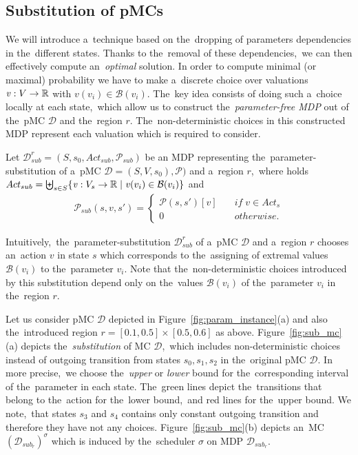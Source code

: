 \subsection{Substitution of pMCs}
We will introduce a~technique based on the~dropping of parameters dependencies in the~different states.
Thanks to the~removal of these dependencies,~we can then effectively compute an~\textit{optimal} solution.
In order to compute minimal (or maximal) probability we have to make a~discrete choice over valuations $\mathit{v}: V \rightarrow \mathbb{R}$ with $\mathit{v}(v_i) \in \mathcal{B}(v_i)$.
The~key idea consists of doing such a~choice locally at each state,~which allow us to construct the~\textit{parameter-free MDP} out of the~pMC $\mathcal{D}$ and the~region $r$.
The~non-deterministic choices in this constructed MDP represent each valuation which is required to consider.

\begin{definition} \label{def:sub_mc}
Let $\mathcal{D}_{sub}^{r} = (S, s_0, Act_{sub}, \mathcal{P}_{sub})$ be an MDP representing the~parameter-substitution of a~pMC $\mathcal{D} = (S, V, s_0), \mathcal{P})$ and a~region $r$,~where holds $Act_{sub} = \biguplus_{s \in S}\{ \mathit{v}: V_s \rightarrow \mathbb{R} \; \lvert \; \mathit{v}(v_i) \in \mathcal{B}(v_i) \}$ and
\begin{align*}
    \mathcal{P}_{sub}(s, \mathit{v}, s') = 
    \begin{cases}
        \mathcal{P}(s, s')[\mathit{v}] \quad & if \; v \in Act_s \\
        0 \quad & otherwise.
    \end{cases}
\end{align*}
\end{definition}
\noindent
Intuitively,~the~parameter-substitution $\mathcal{D}_{sub}^r$ of a~pMC $\mathcal{D}$ and a~region $r$ chooses an~action $\mathit{v}$ in state $s$ which corresponds to the~assigning of extremal values $\mathcal{B}(v_i)$ to the~parameter $v_i$. 
Note that the~non-deterministic choices introduced by this substitution depend only on the~values $\mathcal{B}(v_i)$ of the~parameter $v_i$ in the~region $r$.

\begin{example}
Let us consider pMC $\mathcal{D}$ depicted in Figure~\ref{fig:param_instance}(a) and also the~introduced region $r = [0.1, 0.5] \times [0.5, 0.6]$ as above.
Figure~\ref{fig:sub_mc}(a) depicts the~\textit{substitution} of MC $\mathcal{D}$,~which includes non-deterministic choices instead of outgoing transition from states $s_0, s_1, s_2$ in the~original pMC $\mathcal{D}$.
In more precise,~we choose the~\textit{upper} or \textit{lower} bound for the~corresponding interval of the~parameter in each state.
The~green lines depict the~transitions that belong to the~action for the~lower bound,~and red lines for the~upper bound.
We note,~that states $s_3$ and $s_4$ contains only constant outgoing transition and therefore they have not any choices.
Figure~\ref{fig:sub_mc}(b) depicts an~MC $(\mathcal{D}_{sub_r})^\sigma$ which is induced by the~scheduler $\sigma$ on MDP $\mathcal{D}_{sub_r}$.
\end{example}

